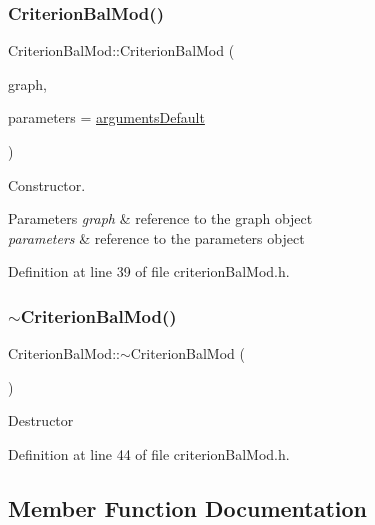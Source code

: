 \subsubsection{\texorpdfstring{Criterion\+Bal\+Mod()}{CriterionBalMod()}}
{\footnotesize\ttfamily Criterion\+Bal\+Mod\+::\+Criterion\+Bal\+Mod (\begin{DoxyParamCaption}\item[{const \hyperlink{classGraphUndirectedGroupable}{Graph\+Undirected\+Groupable} \&}]{graph,  }\item[{const \hyperlink{structProgramParameters}{Program\+Parameters} \&}]{parameters = {\ttfamily \hyperlink{program_8h_ae2d819404495f80f31db7676c1329d19}{arguments\+Default}} }\end{DoxyParamCaption})\hspace{0.3cm}{\ttfamily [inline]}}

Constructor.


\begin{DoxyParams}{Parameters}
{\em graph} & reference to the graph object \\
\hline
{\em parameters} & reference to the parameters object \\
\hline
\end{DoxyParams}


Definition at line 39 of file criterion\+Bal\+Mod.\+h.

\mbox{\label{classCriterionBalMod_a7b436498c68a76ecd7adecc9280900d0}} 
\subsubsection{\texorpdfstring{$\sim$\+Criterion\+Bal\+Mod()}{~CriterionBalMod()}}
{\footnotesize\ttfamily Criterion\+Bal\+Mod\+::$\sim$\+Criterion\+Bal\+Mod (\begin{DoxyParamCaption}{ }\end{DoxyParamCaption})\hspace{0.3cm}{\ttfamily [inline]}}

Destructor 

Definition at line 44 of file criterion\+Bal\+Mod.\+h.



\subsection{Member Function Documentation}
\mbox{\label{classCriterionBalMod_acf5001622eb8c495a5d5e8f044c22395}} 
